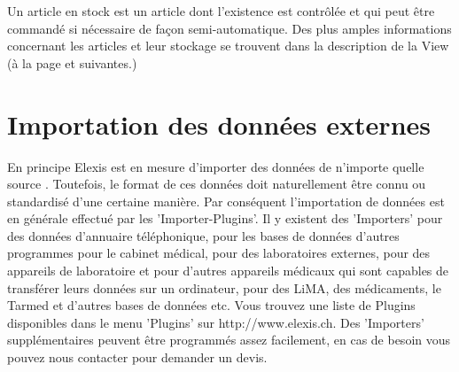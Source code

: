  Un article en stock est un article dont l'existence est contrôlée et qui peut être commandé si nécessaire de façon semi-automatique. Des plus amples informations concernant les articles et leur stockage se trouvent dans la description de la View (à la page \pageref{view:artikel} et suivantes.)

\section{Importation des données externes }
En principe Elexis est en mesure d'importer des données de n'importe quelle source .
Toutefois, le format de ces données doit naturellement être connu ou standardisé d'une certaine manière. Par conséquent l'importation de données est en générale effectué par les 'Importer-Plugins'.
Il y existent des 'Importers' pour des données d'annuaire téléphonique, pour les bases de données d'autres programmes pour le cabinet médical, pour des laboratoires externes, pour des appareils de laboratoire et pour d'autres appareils médicaux qui sont capables de transférer leurs données sur un ordinateur, pour des LiMA, des médicaments,
le Tarmed et d'autres bases de données etc.
Vous trouvez une liste de Plugins disponibles dans le menu 'Plugins' sur  http://www.elexis.ch. Des 'Importers' supplémentaires peuvent être programmés assez facilement, en cas de besoin vous pouvez nous contacter pour demander un devis.

\medskip

